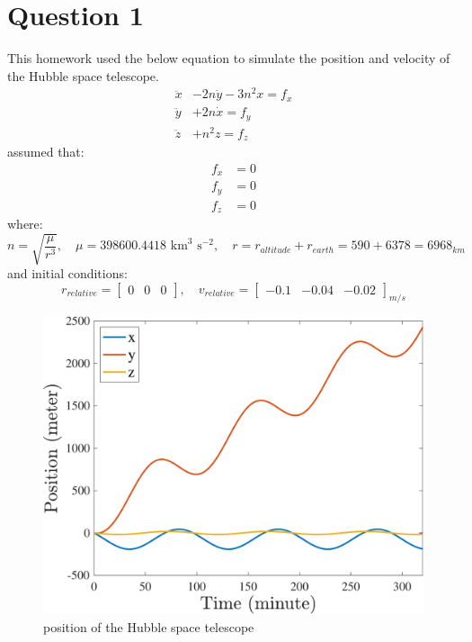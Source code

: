 \section{Question 1}
This homework used the below equation to simulate the position and velocity of the Hubble space telescope.
\begin{align*}
    \ddot x& - 2n\dot y -3n^2x = f_x \\
    \ddot y& + 2n\dot x = f_y \\
    \ddot z& + n^2z= f_z
\end{align*}
assumed that:
\begin{align*}
    f_x& = 0 \\
    f_y& = 0 \\
    f_z& = 0
\end{align*}
where:
\begin{equation*}
    n = \sqrt{\dfrac{\mu}{r^3}}, \quad \mu = 398600.4418 \text{ km}^3 \text{ s}^{-2}, \quad r = r_{altitude} + r_{earth} = 590 + 6378 = 6968_{km}
\end{equation*}
and initial conditions:
$$
r_{relative} = 
\begin{bmatrix}
    0 & 0 & 0
\end{bmatrix}, \quad v_{relative} = \begin{bmatrix}
    -0.1 & -0.04 & -0.02
\end{bmatrix}_{m/s}
$$

\begin{figure}[H]
    \caption{position of the Hubble space telescope}
    \centering
    \includegraphics[width=12cm]{../Figure/Q1/position}
\end{figure}

